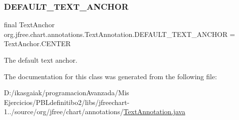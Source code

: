 \subsubsection{\texorpdfstring{D\+E\+F\+A\+U\+L\+T\+\_\+\+T\+E\+X\+T\+\_\+\+A\+N\+C\+H\+OR}{DEFAULT\_TEXT\_ANCHOR}}
{\footnotesize\ttfamily final Text\+Anchor org.\+jfree.\+chart.\+annotations.\+Text\+Annotation.\+D\+E\+F\+A\+U\+L\+T\+\_\+\+T\+E\+X\+T\+\_\+\+A\+N\+C\+H\+OR = Text\+Anchor.\+C\+E\+N\+T\+ER\hspace{0.3cm}{\ttfamily [static]}}

The default text anchor. 

The documentation for this class was generated from the following file\+:\begin{DoxyCompactItemize}
\item 
D\+:/ikasgaiak/programacion\+Avanzada/\+Mis Ejercicios/\+P\+B\+Ldefinitibo2/libs/jfreechart-\/1../source/org/jfree/chart/annotations/\mbox{\hyperlink{_text_annotation_8java}{Text\+Annotation.\+java}}\end{DoxyCompactItemize}
